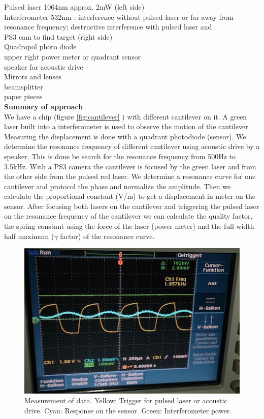 \documentclass[12pt,a4paper]{article}
\begin{document}
\begin{multicols}{2}
\noindent
Pulsed laser 1064nm approx. 2mW (left side)\\
Interferometer 532nm ; interference without pulsed laser or far away from resonance frequency; destructive interference with pulsed laser and\\
PS3 cam to find target (right side)\\
Quadropol photo diode\\
upper right power meter or quadrant sensor\\
speaker for acoustic drive \\
Mirrors and lenses\\
beamsplitter\\
paper pieces\\

\textbf{Summary of approach}\\
We have a chip (figure \ref{fig:cantilever} ) with different cantilever on it. A green laser built into a interferometer is used to observe the motion of the cantilever. Measuring the displacement is done with a quadrant photodiode (sensor). We determine the resonance frequency of different cantilever using acoustic drive by a speaker. This is done be search for the resonance frequency from 500Hz to 3.5kHz. With a PS3 camera the cantilever is focused by the green laser and from the other side from the pulsed red laser. We determine a resonance curve for one cantilever and protocol the phase and normalize the amplitude. Then we calculate the proportional constant (V/m) to get a displacement in meter on the sensor. After focusing both lasers on the cantilever and triggering the pulsed laser on the resonance frequency of the cantilever we can calculate the quality factor, the spring constant using the force of the laser (power-meter) and the full-width half maximum ($\gamma$ factor) of the resonance curve.

\begin{figure}[H]
	\centering
	\includegraphics[scale=0.5]{../figures/messung.png}
	\caption{Measurement of data. Yellow:  Trigger for pulsed laser or acoustic drive. Cyan: Response on the sensor. Green: Interferometer power.}
	\label{fig:measurement}
\end{figure}


\end{multicols}
\end{document}
